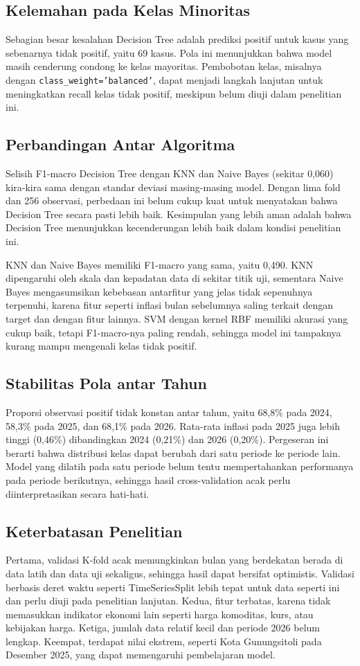 \documentclass[conference]{IEEEtran}
\begin{document}
\subsection{Kelemahan pada Kelas Minoritas}
Sebagian besar kesalahan Decision Tree adalah prediksi positif untuk kasus yang sebenarnya tidak positif, yaitu 69 kasus. Pola ini menunjukkan bahwa model masih cenderung condong ke kelas mayoritas. Pembobotan kelas, misalnya dengan \texttt{class\_weight='balanced'}, dapat menjadi langkah lanjutan untuk meningkatkan recall kelas tidak positif, meskipun belum diuji dalam penelitian ini.

\subsection{Perbandingan Antar Algoritma}
Selisih F1-macro Decision Tree dengan KNN dan Naive Bayes (sekitar 0,060) kira-kira sama dengan standar deviasi masing-masing model. Dengan lima fold dan 256 observasi, perbedaan ini belum cukup kuat untuk menyatakan bahwa Decision Tree secara pasti lebih baik. Kesimpulan yang lebih aman adalah bahwa Decision Tree menunjukkan kecenderungan lebih baik dalam kondisi penelitian ini.

KNN dan Naive Bayes memiliki F1-macro yang sama, yaitu 0,490. KNN dipengaruhi oleh skala dan kepadatan data di sekitar titik uji, sementara Naive Bayes mengasumsikan kebebasan antarfitur yang jelas tidak sepenuhnya terpenuhi, karena fitur seperti inflasi bulan sebelumnya saling terkait dengan target dan dengan fitur lainnya. SVM dengan kernel RBF memiliki akurasi yang cukup baik, tetapi F1-macro-nya paling rendah, sehingga model ini tampaknya kurang mampu mengenali kelas tidak positif.

\subsection{Stabilitas Pola antar Tahun}
Proporsi observasi positif tidak konstan antar tahun, yaitu 68,8\% pada 2024, 58,3\% pada 2025, dan 68,1\% pada 2026. Rata-rata inflasi pada 2025 juga lebih tinggi (0,46\%) dibandingkan 2024 (0,21\%) dan 2026 (0,20\%). Pergeseran ini berarti bahwa distribusi kelas dapat berubah dari satu periode ke periode lain. Model yang dilatih pada satu periode belum tentu mempertahankan performanya pada periode berikutnya, sehingga hasil cross-validation acak perlu diinterpretasikan secara hati-hati.

\subsection{Keterbatasan Penelitian}
Pertama, validasi K-fold acak memungkinkan bulan yang berdekatan berada di data latih dan data uji sekaligus, sehingga hasil dapat bersifat optimistis. Validasi berbasis deret waktu seperti TimeSeriesSplit lebih tepat untuk data seperti ini dan perlu diuji pada penelitian lanjutan. Kedua, fitur terbatas, karena tidak memasukkan indikator ekonomi lain seperti harga komoditas, kurs, atau kebijakan harga. Ketiga, jumlah data relatif kecil dan periode 2026 belum lengkap. Keempat, terdapat nilai ekstrem, seperti Kota Gunungsitoli pada Desember 2025, yang dapat memengaruhi pembelajaran model.
\end{document}
